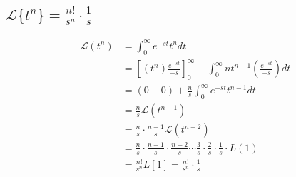         \subsection{\texorpdfstring{$\displaystyle \mathcal{L}\{t^{n}\}=\frac{n!}{s^{n}}\cdot\frac{1}{s}$}{Lg}}
        \begin{align*}
            \mathcal{L}(t^{n}) &= \displaystyle \int_{0}^{\infty}e^{-st}t^{n}dt\\
            &= \left[(t^{n})\frac{e^{-st}}{-s}\right]_{0}^{\infty}-\int_{0}^{\infty}nt^{n-1}(\frac{e^{-st}}{-s})dt\\
            &= (0-0)+\frac{n}{s}\int_{0}^{\infty}e^{-st}t^{n-1}dt\\
            &= \frac{n}{s}\mathcal{L}(t^{n-1})\\
            &= \frac{n}{s} \cdot \frac{n-1}{s} \mathcal{L}(t^{n-2})\\
            &= \frac{n}{s}\cdot\frac{n-1}{s}\cdot\frac{n-2}{s} \cdots \frac{3}{s}\cdot\frac{2}{s}\cdot\frac{1}{s}\cdot L(1)\\
            &= \frac{n!}{s^{n}}L[1]=\frac{n!}{s^{n}}\cdot\frac{1}{s}
        \end{align*}


